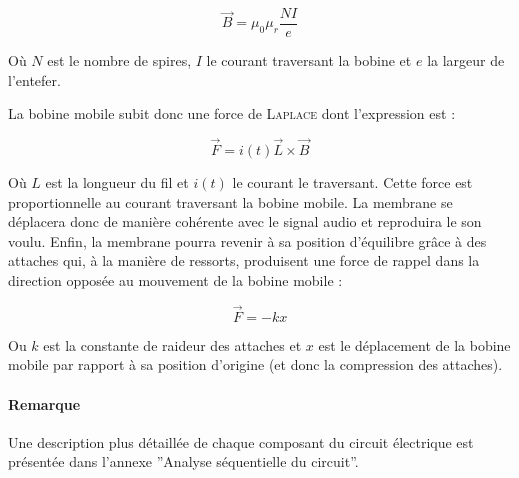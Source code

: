 $$\vec{B} = \mu_0\mu_r\frac{NI}{e}$$

Où $N$ est le nombre de spires, $I$ le courant traversant la bobine et $e$ la largeur de 
l'entefer.

La bobine mobile subit donc une force de \textsc{Laplace} dont l'expression est :

$$\vec{F} = i(t)\vec{L}\times{\vec{B}}$$ 

Où $L$ est la longueur du fil et $i(t)$ le courant le traversant. Cette force est proportionnelle
au courant traversant
la bobine mobile. La membrane se déplacera donc de manière cohérente avec le signal audio
et reproduira le son voulu. Enfin, la membrane pourra revenir à sa position d'équilibre
grâce à des attaches qui, à la manière de ressorts, produisent une force de rappel dans la
direction opposée au mouvement de la bobine mobile :

$$\vec{F} = -kx$$ %

Ou $k$ est la constante de raideur des attaches et $x$ est le déplacement de la bobine mobile
par rapport à sa position d'origine (et donc la compression des attaches).

\paragraph{Remarque}
Une description plus détaillée de chaque composant du circuit électrique est présentée
dans l'annexe ''Analyse séquentielle du circuit''.


